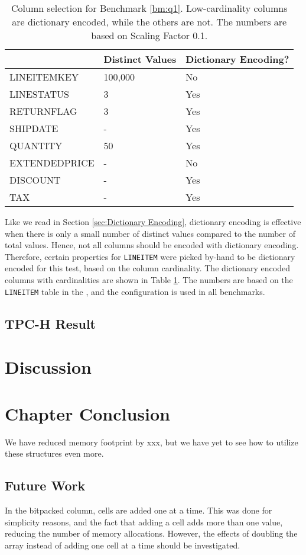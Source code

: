 \begin{table}
    \begin{tabularx}{\textwidth}{X | X X}
        & Distinct Values & Dictionary Encoding? \\ 
        \hline
        \hline
        LINEITEMKEY & 100,000 & No \\
        LINESTATUS & 3 & Yes \\
        RETURNFLAG & 3 & Yes \\
        SHIPDATE & - & Yes \\
        QUANTITY & 50 & Yes \\
        EXTENDEDPRICE & - & No \\
        DISCOUNT & - & Yes \\
        TAX & - & Yes
    \end{tabularx}
    \caption{Column selection for Benchmark \ref{bm:q1}. Low-cardinality columns are dictionary encoded, while the others are not. The numbers are based on Scaling Factor 0.1.}
    \label{tab:column-selection}
\end{table}
Like we read in Section \ref{sec:Dictionary Encoding}, dictionary encoding is effective when there is only a small number of distinct values compared to the number of total values. Hence, not all columns should be encoded with dictionary encoding. Therefore, certain properties for \texttt{LINEITEM} were picked by-hand to be dictionary encoded for this test, based on the column cardinality. The dictionary encoded columns with cardinalities are shown in Table \ref{tab:column-selection}. The numbers are based on the \texttt{LINEITEM} table in the \tpch, and the configuration is used in all benchmarks.

\subsection{TPC-H Result}
\label{sub:TPC-H Result}

\section{Discussion}
\label{sec:Discussion}


\section{Chapter Conclusion}
\label{sec:Chapter Conclusion}
We have reduced memory footprint by xxx, but we have yet to see how to utilize these structures even more.

\subsection{Future Work}
\label{sub:Future Work}
In the bitpacked column, cells are added one at a time. This was done for simplicity reasons, and the fact that adding a cell adds more than one value, reducing the number of memory allocations. However, the effects of doubling the array instead of adding one cell at a time should be investigated.
